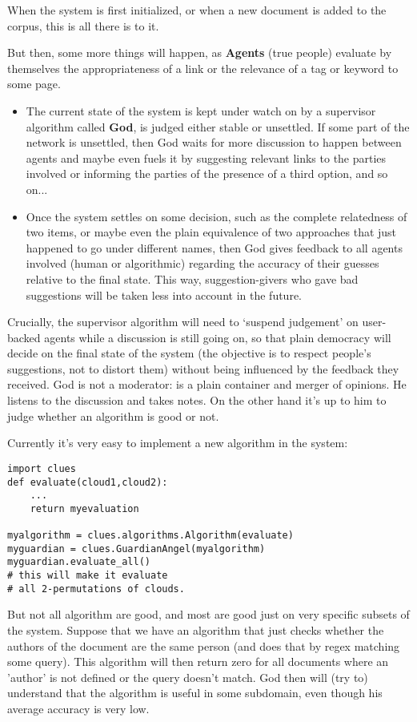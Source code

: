 \documentclass[11pt]{article}
\begin{document}
When the system is first initialized, or when a new document is added to the corpus, this is all there is to it.

But then, some more things will happen, as {\bf Agents} (true people) evaluate by themselves the appropriateness of a link or the relevance of a tag or keyword to some page.

\begin{itemize}
\item The current state of the system is kept under watch on by a supervisor algorithm called {\bf God}, is judged either stable or unsettled. If some part of the network is unsettled, then God waits for more discussion to happen between agents and maybe even fuels it by suggesting relevant links to the parties involved or informing the parties of the presence of a third option, and so on...
\item Once the system settles on some decision, such as the complete relatedness of two items, or maybe even the plain equivalence of two approaches that just happened to go under different names, then God gives feedback to all agents involved (human or algorithmic) regarding the accuracy of their guesses relative to the final state. This way, suggestion-givers who gave bad suggestions will be taken less into account in the future.
\end{itemize}

Crucially, the supervisor algorithm will need to `suspend judgement' on user-backed agents while a discussion is still going on, so that plain democracy will decide on the final state of the system (the objective is to respect people's suggestions, not to distort them) without being influenced by the feedback they received. God is not a moderator: is a plain container and merger of opinions. He listens to the discussion and takes notes. On the other hand it's up to him to judge whether an algorithm is good or not.

Currently it's very easy to implement a new algorithm in the system:

\begin{lstlisting}
import clues
def evaluate(cloud1,cloud2):
	...
	return myevaluation

myalgorithm = clues.algorithms.Algorithm(evaluate)
myguardian = clues.GuardianAngel(myalgorithm)
myguardian.evaluate_all() 
# this will make it evaluate
# all 2-permutations of clouds.
\end{lstlisting}

But not all algorithm are good, and most are good just on very specific subsets of the system. Suppose that we have an algorithm that just checks whether the authors of the document are the same person (and does that by regex matching some query). This algorithm will then return zero for all documents where an 'author' is not defined or the query doesn't match. God then will (try to) understand that the algorithm is useful in some subdomain, even though his average accuracy is very low.
\end{document}
